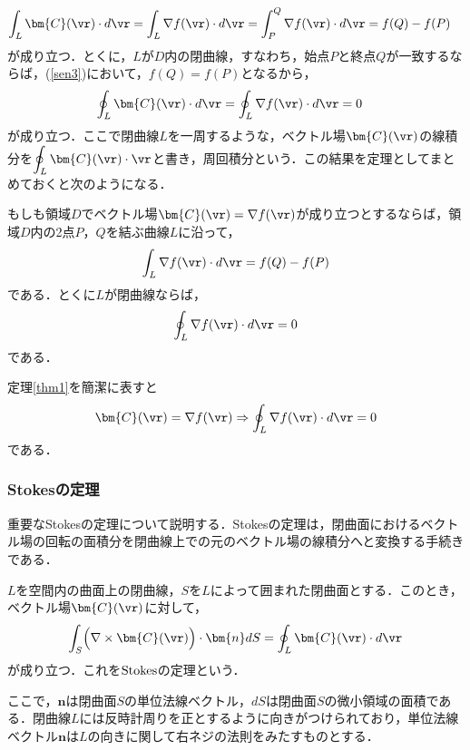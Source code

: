 \begin{align}\label{sen3}
\int_L\bm{C}(\vr)\cdot d\vr&=\int_L\nabla f(\vr)\cdot d\vr=\int_P^Q\nabla f(\vr)\cdot d\vr=f(Q)-f(P)
\end{align}
が成り立つ．とくに，$L$が$D$内の閉曲線，すなわち，始点$P$と終点$Q$が一致するならば，(\ref{sen3})において，$f(Q)=f(P)$となるから，
\begin{align}\label{sen4}
\oint_L\bm{C}(\vr)\cdot d\vr&=\oint_L\nabla f(\vr)\cdot d\vr=0
\end{align}
が成り立つ．ここで閉曲線$L$を一周するような，ベクトル場$\bm{C}(\vr)$の線積分を$\displaystyle\oint_L\bm{C}(\vr)\cdot\vr$と書き，周回積分という．この結果を定理としてまとめておくと次のようになる．
\begin{theorem}\label{thm1}
もしも領域$D$でベクトル場$\bm{C}(\vr)=\nabla f(\vr)$が成り立つとするならば，領域$D$内の2点$P$，$Q$を結ぶ曲線$L$に沿って，
\begin{align}
\int_L\nabla f(\vr)\cdot d\vr=f(Q)-f(P)
\end{align}
である．とくに$L$が閉曲線ならば，
\begin{align}
\oint_L\nabla f(\vr)\cdot d\vr=0
\end{align}
である．
\end{theorem}
定理\ref{thm1}を簡潔に表すと
\begin{align}
\bm{C}(\vr)=\nabla f(\vr)\Rightarrow \oint_L\nabla f(\vr)\cdot d\vr=0
\end{align}
である．









%
\subsubsection{Stokesの定理}
重要なStokesの定理について説明する．Stokesの定理は，閉曲面におけるベクトル場の回転の面積分を閉曲線上での元のベクトル場の線積分へと変換する手続きである．
\begin{theorem}[Stokesの定理]\label{sto}
$L$を空間内の曲面上の閉曲線，$S$を$L$によって囲まれた閉曲面とする．このとき，ベクトル場$\bm{C}(\vr)$に対して，
\begin{align}
\int_S\Bigl(\nabla\times\bm{C}(\vr)\Bigr)\cdot\bm{n}dS=\oint_L\bm{C}(\vr)\cdot d\vr
\end{align}
が成り立つ．これを$\rm{Stokes}$の定理という．
\end{theorem}
ここで，$\bm{n}$は閉曲面$S$の単位法線ベクトル，$dS$は閉曲面$S$の微小領域の面積である．閉曲線$L$には反時計周りを正とするように向きがつけられており，単位法線ベクトル$\bm{n}$は$L$の向きに関して右ネジの法則をみたすものとする．









